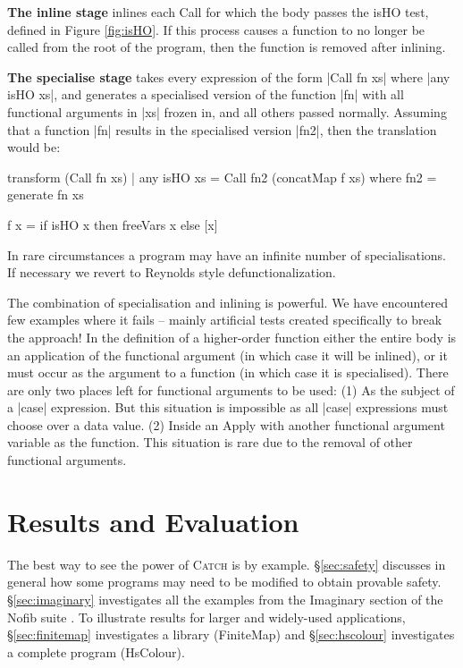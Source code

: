 \documentclass[preprint]{sigplanconf}
\let\cite=\citep
\newcommand{\C}[1]{\textsf{#1}}
\newcommand{\catch}{\textsc{Catch}}
\newcommand{\para}[1]{\vspace{2mm}\noindent\textbf{#1}}
\begin{document}
\para{The \C{inline} stage} inlines each \C{Call} for which the body passes the \C{isHO} test, defined in Figure \ref{fig:isHO}. If this process causes a function to no longer be called from the root of the program, then the function is removed after inlining.

\para{The \C{specialise} stage} takes every expression of the form |Call fn xs| where |any isHO xs|, and generates a specialised version of the function |fn| with all functional arguments in |xs| frozen in, and all others passed normally. Assuming that a function |fn| results in the specialised version |fn2|, then the translation would be:

\begin{code}
transform (Call fn xs) | any isHO xs =
    Call fn2 (concatMap f xs)
    where
    fn2 = generate fn xs

    f x = if isHO x then freeVars x else [x]
\end{code}

In rare circumstances a program may have an infinite number of specialisations. If necessary we revert to Reynolds style defunctionalization.

The combination of specialisation and inlining is powerful. We have encountered few examples where it fails -- mainly artificial tests created specifically to break the approach! In the definition of a higher-order function either the entire body is an application of the functional argument (in which case it will be inlined), or it must occur as the argument to a function (in which case it is specialised). There are only two places left for functional arguments to be used: (1) As the subject of a |case| expression. But this situation is impossible as all |case| expressions must choose over a data value. (2) Inside an \C{Apply} with another functional argument variable as the function. This situation is rare due to the removal of other functional arguments.

\section{Results and Evaluation}
\label{sec:results}

The best way to see the power of \catch{} is by example. \S\ref{sec:safety} discusses in general how some programs may need to be modified to obtain provable safety. \S\ref{sec:imaginary} investigates all the examples from the Imaginary section of the Nofib suite \cite{nofib}. To illustrate results for larger and widely-used applications, \S\ref{sec:finitemap} investigates a library (FiniteMap) and \S\ref{sec:hscolour} investigates a complete program (HsColour).
\end{document}
